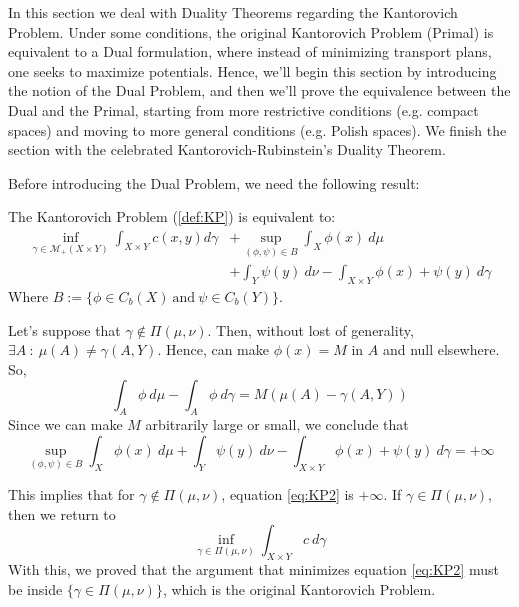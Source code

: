 In this section we deal with Duality Theorems regarding the Kantorovich Problem.
Under some conditions, the original Kantorovich Problem (Primal) is equivalent to a Dual
formulation, where instead of minimizing transport plans, one seeks to maximize potentials.
Hence, we'll begin this section by introducing the notion of the Dual Problem, and then we'll prove the
equivalence between the Dual and the Primal, starting from more restrictive conditions (e.g. compact spaces)
and moving to more general conditions (e.g. Polish spaces). We finish the section with the celebrated
Kantorovich-Rubinstein's Duality Theorem.

Before introducing the Dual Problem, we need the following result:
\begin{lemma}

  The Kantorovich Problem (\ref{def:KP}) is equivalent to:
\begin{align}
  \inf_{\gamma \in \mathcal M_+(X\times Y)}
  \int_{X \times Y} c(x,y)d\gamma &+
  \sup_{(\phi,\psi) \in B}
  \int_X \phi(x) \ d\mu
  \nonumber
  \\
  &+ \int_Y \psi(y) \ d\nu
  - \int_{X\times Y} \phi(x) + \psi(y) \ d\gamma
  \label{eq:KP2}
\end{align}
Where $B := \{\phi \in C_b(X) \ \mathrm{and} \ \psi \in C_b(Y)\}$.
\end{lemma}
\begin{prf}
  Let's suppose that $\gamma \notin \Pi(\mu,\nu)$.
  Then, without lost of generality, $\exists A \ : \ \mu(A) \neq
    \gamma(A,Y)$. Hence, can make $\phi(x) = M$ in $A$ and null elsewhere.
  So,
  \begin{equation*}
    \int_A \phi \ d\mu - \int_A \phi \ d\gamma	= M(\mu(A)-\gamma(A,Y))
  \end{equation*}
  Since we can make $M$ arbitrarily large or small, we conclude that
  \begin{equation*}
    \sup_{(\phi,\psi) \in B}
    \int_X \phi(x) \ d\mu + \int_Y \psi(y) \ d\nu -
    \int_{X\times Y} \phi(x) + \psi(y) \ d\gamma = +\infty
  \end{equation*}

  This implies that for $\gamma \notin \Pi(\mu,\nu)$, equation \eqref{eq:KP2}
  is $+\infty$. If $\gamma \in \Pi(\mu,\nu)$, then we return to
  \begin{equation*}
    \inf_{\gamma \in \Pi(\mu,\nu)} \int_{X\times Y} c \ d\gamma
  \end{equation*}
  With this, we proved that the argument that minimizes
  equation \eqref{eq:KP2} must
  be inside $\{\gamma \in \Pi(\mu,\nu)\}$, which is the original Kantorovich
  Problem.
\end{prf}

